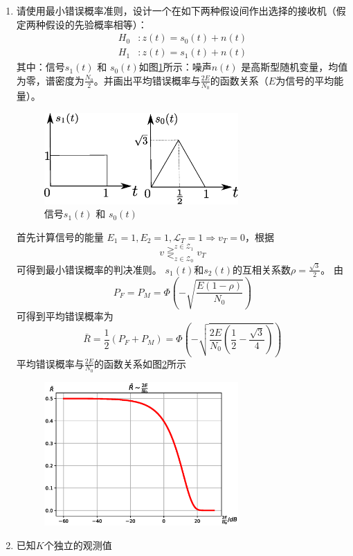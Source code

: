 \documentclass{article}
\begin{document}
\begin{enumerate}
\begin{solution}
\end{solution}
\item 请使用最小错误概率准则，设计一个在如下两种假设间作出选择的接收机（假定两种假设的先验概率相等）：
\begin{align*}
H_0 & :  z(t) = s_0(t) + n(t) \\
H_1 & :  z(t) = s_1(t) + n(t)
\end{align*}
其中：信号$s_1(t)$ 和 $s_0(t)$如图\ref{fig:13}所示：噪声$n(t)$ 是高斯型随机变量，均值为零，谱密度为$\frac{N_0}{2}$。并画出平均错误概率与$\frac{2E}{N_0}$的函数关系（$E$为信号的平均能量）。
\begin{figure}[!ht]
\centering
\includegraphics[width=0.7\textwidth]{practice_13.eps}
\caption{信号$s_1(t)$ 和 $s_0(t)$}\label{fig:13}
\end{figure}
\begin{solution}
首先计算信号的能量 $E_1=1,E_2=1,\mathscr{L}_T=1\Rightarrow v_T=0$，根据
\begin{equation}
v \mathop{\gtreqless}^{z\in \mathcal{Z}_1}_{z \in \mathcal{Z}_0} v_T
\end{equation}
可得到最小错误概率的判决准则。
$s_1(t)$和$s_2(t)$的互相关系数$\rho=\frac{\sqrt{3}}{2}$。
由
\begin{equation}\label{eq:continuous_eq_prob}
P_F=P_M=\Phi(-\sqrt{\frac{E(1-\rho)}{N_0}})
\end{equation}
可得到平均错误概率为
$$
\bar{R}=\frac{1}{2}(P_F+P_M)=\Phi\left(-\sqrt{\frac{2E}{N_0}\left(\frac{1}{2}-\frac{\sqrt{3}}{4}\right)}\right)
$$
平均错误概率与$\frac{2E}{N_0}$的函数关系如图\ref{fig:average_error_with_SNR}所示

\begin{figure}[!ht]
\centering
\includegraphics[width=0.7\textwidth]{average_error_with_SNR.eps}
\caption{}\label{fig:average_error_with_SNR}
\end{figure}
\end{solution}
\item 已知$K$个独立的观测值


\end{enumerate}
\end{document}
